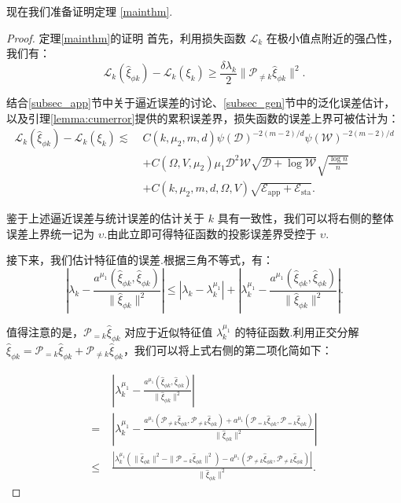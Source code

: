 现在我们准备证明定理 \ref{mainthm}.
\begin{proof}{定理\ref{mainthm}的证明}
首先，利用损失函数 $\mathcal{L}_{k}$ 在极小值点附近的强凸性，我们有：
$$\mathcal{L}_{k}(\widehat{\xi}_{\phi k})-\mathcal{L}_{k}(\xi_{k})\geq \frac{\delta \lambda_{k}}{2}\|\mathcal{P}_{\neq k}\widehat{\xi}_{\phi k}\|^{2}.$$

结合\ref{subsec_app}节中关于逼近误差的讨论、\ref{subsec_gen}节中的泛化误差估计，以及引理\ref{lemma:cumerror}提供的累积误差界，损失函数的误差上界可被估计为：
$$
\begin{aligned}
\mathcal{L}_{k}(\widehat{\xi}_{\phi k})-\mathcal{L}_{k}(\xi_{k}) \lesssim\;& C(k,\mu_{2},m,d)\psi(\mathcal{D})^{-2(m-2) / d} \psi(\mathcal{W})^{-2(m-2) / d}\\
&+ C(\Omega,V,\mu_{2})\mu_{1}\mathcal{D}^2 \mathcal{W} \sqrt{\mathcal{D}+\log \mathcal{W}}\sqrt{\frac{\log n}{n}}\\
&+C(k,\mu_{2},m,d,\Omega,V)\sqrt{\mathcal{E}_{\text{app}}+\mathcal{E}_{\text{sta}}}.
\end{aligned}
$$

鉴于上述逼近误差与统计误差的估计关于 $k$ 具有一致性，我们可以将右侧的整体误差上界统一记为 $\upsilon$.由此立即可得特征函数的投影误差界受控于 $\upsilon$.

接下来，我们估计特征值的误差.根据三角不等式，有：
$$\left|\lambda_{k}-\frac{a^{\mu_{1}}\left(\widehat{\xi}_{\phi k}, \widehat{\xi}_{\phi k}\right)}{\|\widehat{\xi}_{\phi k}\|^{2}}\right|\leq\left|\lambda_k-\lambda_k^{\mu_1}\right|+\left|\lambda_{k}^{\mu_1}-\frac{a^{\mu_{1}}\left(\widehat{\xi}_{\phi k}, \widehat{\xi}_{\phi k}\right)}{\|\widehat{\xi}_{\phi k}\|^{2}}\right|.$$

值得注意的是，$\mathcal{P}_{=k} \widehat{\xi}_{\phi k}$ 对应于近似特征值 $\lambda_k^{\mu_1}$ 的特征函数.利用正交分解 $\widehat{\xi}_{\phi k} = \mathcal{P}_{=k} \widehat{\xi}_{\phi k} + \mathcal{P}_{\neq k} \widehat{\xi}_{\phi k}$，我们可以将上式右侧的第二项化简如下：

$$
\begin{aligned}
&\left|\lambda_{k}^{\mu_1}-\frac{a^{\mu_{1}}\left(\widehat{\xi}_{\phi k}, \widehat{\xi}_{\phi k}\right)}{\|\widehat{\xi}_{\phi k}\|^{2}}\right| \\
=\;& \left|\lambda_k^{\mu_1}-\frac{a^{\mu_{1}}\left(\mathcal{P}_{\neq k} \widehat{\xi}_{\phi k}, \mathcal{P}_{\neq k} \widehat{\xi}_{\phi k}\right)+a^{\mu_{1}}\left(\mathcal{P}_{=k} \widehat{\xi}_{\phi k}, \mathcal{P}_{=k} \widehat{\xi}_{\phi k}\right)}{\|\widehat{\xi}_{\phi k}\|^{2}}\right| \\
\leq\;& \frac{\left|\lambda_{k}^{\mu_1}\left(\|\widehat{\xi}_{\phi k}\|^2-\|\mathcal{P}_{=k}\widehat{\xi}_{\phi k}\|^2\right)-a^{\mu_{1}}\left(\mathcal{P}_{\neq k} \widehat{\xi}_{\phi k}, \mathcal{P}_{\neq k} \widehat{\xi}_{\phi k}\right)\right|}{\|\widehat{\xi}_{\phi k}\|^2}.
\end{aligned}
$$


\end{proof}
